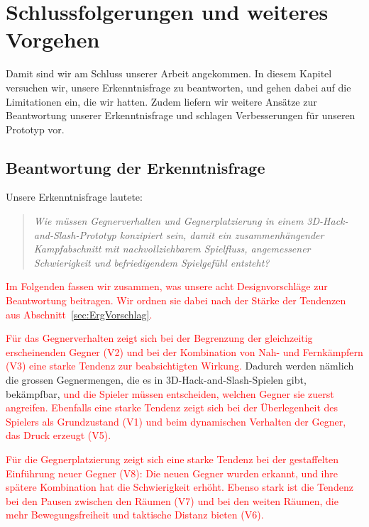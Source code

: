 \documentclass[../Main.tex]{subfiles}
\begin{document}
\section{Schlussfolgerungen und weiteres Vorgehen} \label{sec:Schlussfolgerungen}

Damit sind wir am Schluss unserer Arbeit angekommen. In diesem Kapitel versuchen wir, unsere Erkenntnisfrage zu beantworten, und gehen dabei auf die Limitationen ein, die wir hatten. Zudem liefern wir weitere Ansätze zur Beantwortung unserer Erkenntnisfrage und schlagen Verbesserungen für unseren Prototyp vor.

\subsection{Beantwortung der Erkenntnisfrage} \label{sec:Beantwortung}

Unsere Erkenntnisfrage lautete:

\begin{quote}
    \textit{Wie müssen Gegnerverhalten und Gegnerplatzierung in einem 3D-Hack-and-Slash-Prototyp konzipiert sein, damit ein zusammenhängender Kampfabschnitt mit nachvollziehbarem Spielfluss, angemessener Schwierigkeit und befriedigendem Spielgefühl entsteht?}
\end{quote}

\textcolor{red}{Im Folgenden fassen wir zusammen, was unsere acht Designvorschläge zur Beantwortung beitragen. Wir ordnen sie dabei nach der Stärke der Tendenzen aus Abschnitt~\ref{sec:ErgVorschlag}.}

\textcolor{red}{Für das Gegnerverhalten zeigt sich bei der Begrenzung der gleichzeitig erscheinenden Gegner (V2) und bei der Kombination von Nah- und Fernkämpfern (V3) eine starke Tendenz zur beabsichtigten Wirkung.} Dadurch werden nämlich die grossen Gegnermengen, die es in 3D-Hack-and-Slash-Spielen gibt, bekämpfbar, \textcolor{red}{und die Spieler müssen entscheiden, welchen Gegner sie zuerst angreifen.} \textcolor{red}{Ebenfalls eine starke Tendenz zeigt sich bei der Überlegenheit des Spielers als Grundzustand (V1) und beim dynamischen Verhalten der Gegner, das Druck erzeugt (V5).}

\textcolor{red}{Für die Gegnerplatzierung zeigt sich eine starke Tendenz bei der gestaffelten Einführung neuer Gegner (V8): Die neuen Gegner wurden erkannt, und ihre spätere Kombination hat die Schwierigkeit erhöht. Ebenso stark ist die Tendenz bei den Pausen zwischen den Räumen (V7) und bei den weiten Räumen, die mehr Bewegungsfreiheit und taktische Distanz bieten (V6).}
\end{document}
